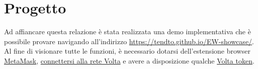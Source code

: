 \chapter*{Progetto}
Ad affiancare questa relazione è stata realizzata una demo implementativa che è possibile provare navigando all'indirizzo \url{https://tendto.github.io/EW-showcase/}.
Al fine di visionare tutte le funzioni, è necessario dotarsi dell'estensione browser \href{https://metamask.io/}{MetaMask}, \href{https://energyweb.atlassian.net/wiki/spaces/EWF/pages/703201459/Volta+Connecting+to+Remote+RPC+and+Metamask}{connettersi alla rete Volta} e avere a disposizione qualche \href{https://voltafaucet.energyweb.org/}{Volta token}. \\
